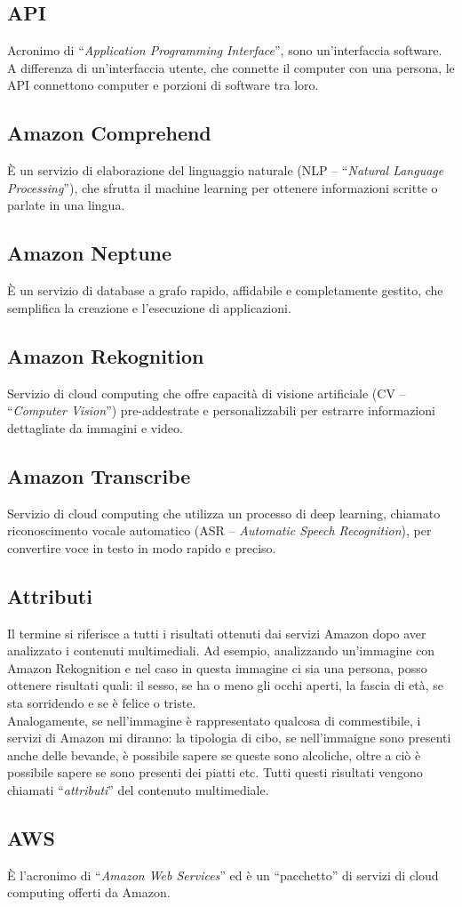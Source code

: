 \subsection{API}
Acronimo di “\textit{Application Programming Interface}”, sono un’interfaccia software. A differenza di un’interfaccia utente, che connette il computer con una persona, le API connettono computer e porzioni di software tra loro.

\subsection{Amazon Comprehend}
È un servizio di elaborazione del linguaggio naturale (NLP – “\textit{Natural Language Processing}”), che sfrutta il machine learning per ottenere informazioni scritte o parlate in una lingua. 

\subsection{Amazon Neptune}
È un servizio di database a grafo rapido, affidabile e completamente gestito, che semplifica la creazione e l’esecuzione di applicazioni. 

\subsection{Amazon Rekognition}
Servizio di cloud computing che offre capacità di visione artificiale (CV – “\textit{Computer Vision}”) pre-addestrate e personalizzabili per estrarre informazioni dettagliate da immagini e video. 

\subsection{Amazon Transcribe}

Servizio di cloud computing che utilizza un processo di deep learning, chiamato riconoscimento vocale automatico (ASR – \textit{Automatic Speech Recognition}), per convertire voce in testo in modo rapido e preciso.

\subsection{Attributi}
Il termine si riferisce a tutti i risultati ottenuti dai servizi Amazon dopo aver analizzato i contenuti multimediali. Ad esempio, analizzando un'immagine con Amazon Rekognition e nel caso in questa immagine ci sia una persona, posso ottenere risultati quali: il sesso, se ha o meno gli occhi aperti, la fascia di età, se sta sorridendo e se è felice o triste. \\ Analogamente, se nell'immagine è rappresentato qualcosa di commestibile, i servizi di Amazon mi diranno: la tipologia di cibo, se nell'immaigne sono presenti anche delle bevande, è possibile sapere se queste sono alcoliche, oltre a ciò è possibile sapere se sono presenti dei piatti etc. Tutti questi risultati vengono chiamati “\textit{attributi}” del contenuto multimediale.

\subsection{AWS}
È l’acronimo di “\textit{Amazon Web Services}” ed è un “pacchetto” di servizi di cloud computing offerti da Amazon. 

\clearpage 